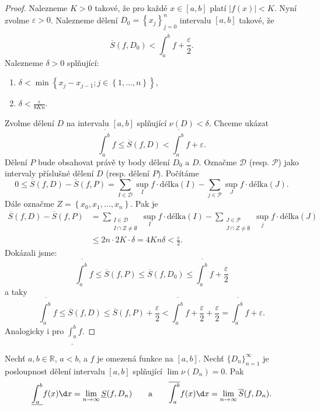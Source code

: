 \begin{proof}
    Nalezneme  $K>0$ takové, že pro každé $x \in [a,b]$ platí $|f(x)|<K$. Nyní zvolme $\varepsilon >0$.
    Nalezneme dělení $D_0 = \left \{ x_j \right \}_{j=0}^n $ intervalu $[a,b]$ takové, že
    $$
        \overline{S}(f,D_0) < \overline{\int_a^b}f+ \frac{\varepsilon}{2}.
    $$
    Nalezneme $\delta >0$ splňující:
    \begin{enumerate}[(1)]
	\item $\delta < \min \left \{ x_j-x_{j-1}; j \in \left \{ 1,\dots,n \right \}  \right \} $,
	\item $\delta < \frac{\varepsilon}{8Kn}$.
    \end{enumerate}
    Zvolme dělení $D$ na intervalu $[a,b]$ splňující $\nu(D)<\delta$. Chceme ukázat
    $$
        \overline{\int_a^b}f \leq \overline {S}(f,D) < \overline{\int_a^b}f+\varepsilon.
    $$
    Dělení $P$ bude obsahovat právě ty body dělení $D_0$ a $D$. Označme $\mathscr D$ (resp. $\mathscr P$) jako intervaly
    příslušné dělení $D$ (resp. dělení $P$). Počítáme
    $$
        0\leq\overline{S}(f,D) - \overline{S}(f,P) = \sum_{I\in \mathscr D}\sup_I f \cdot \text{délka}(I) - \sum_{j\in \mathscr P}\sup_J f \cdot \text{délka}(J).
    $$
    Dále označme $Z = \left \{ x_0,x_1,\dots,x_n \right \} $. Pak je
    \begin{align*}
    \overline{S}(f,D) - \overline{S}(f,P) &= \sum_{\substack{I\in \mathscr D \\ I\cap Z \ne \emptyset}} \sup_I f \cdot \text{délka}(I)-\sum_{\substack{J\in \mathscr P\\ J\cap Z \ne \emptyset}} \sup_j f \cdot \text{délka}(J)\\
    &\leq 2n\cdot 2K\cdot \delta = 4Kn\delta<\frac{\varepsilon}{2}.
    \end{align*}
    Dokázali jsme:
    $$
        \overline{\int _a^b}f\leq \overline{S}(f,P) \leq \overline{S}(f,D_0) \leq \overline{\int_a^b}f+\frac{\varepsilon}{2}
    $$
    a taky
    $$
        \overline{\int_a^b}f \leq \overline{S}(f,D) \leq \overline S(f,P)+\frac{\varepsilon}{2} < \overline{\int_a^b} f + \frac{\varepsilon}{2}+\frac{\varepsilon}{2}=\overline{\int_a^b}f+\varepsilon.
    $$
    Analogicky i pro $\underline{\int_a^b}f$.
\end{proof}

\begin{dusledek}\label{dusledek8.13}
Nechť $a,b \in \mathbb{R}$, $a<b$, a $f$ je omezená funkce na $[a,b]$. Nechť $\{D_n\}_{n=1}^\infty$ je posloupnost dělení intervalu $[a,b]$ splňující $\lim \nu(D_n) = 0$. Pak
\[
\underline{\int_a^b} f(x)\d x = \lim_{n\to\infty} \underline{S}(f,D_n)
\qquad \text{a} \qquad
\overline{\int_a^b} f(x)\d x = \lim_{n\to\infty} \overline{S}(f,D_n).
\]
\end{dusledek}

